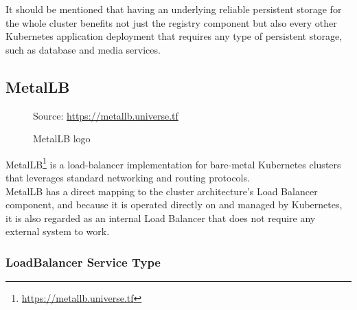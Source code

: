 It should be mentioned that having an underlying reliable persistent storage for
the whole cluster benefits not just the registry component but also every other Kubernetes
application deployment that requires any type of persistent storage, such as
database and media services.

\subsection{MetalLB}
\label{subsec:implementation_dependencies_metallb}

\begin{figure} %
  \centering
  \def\stackalignment{l} %
  {\scriptsize \parbox[t]{\linewidth}{ Source: \url{https://metallb.universe.tf}} }
  \caption{MetalLB logo}
\end{figure}

MetalLB\footnote{\url{https://metallb.universe.tf}} is a load-balancer
implementation for bare-metal Kubernetes clusters that leverages standard
networking and routing protocols. \\ %
MetalLB has a direct mapping to the cluster architecture's Load Balancer
component, and because it is operated directly on and managed by Kubernetes, it
is also regarded as an internal Load Balancer that does not require any external
system to work.

\subsubsection{LoadBalancer Service Type}
\label{subsubsec:implementation_dependencies_metallb__loadbalancer_service_type}

